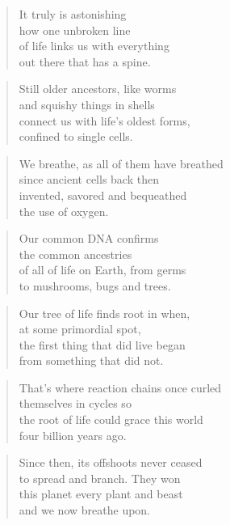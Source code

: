 \documentclass[14pt,a4paper]{article}
\begin{document}
\begin{verse}
It truly is astonishing\\
how one unbroken line\\
of life links us with everything\\
out there that has a spine.
\end{verse}

\begin{verse}
Still older ancestors, like worms\\
and squishy things in shells\\
connect us with life’s oldest forms,\\
confined to single cells.
\end{verse}

\begin{verse}
We breathe, as all of them have breathed\\
since ancient cells back then\\
invented, savored and bequeathed\\
the use of oxygen.
\end{verse}

\begin{verse}
Our common DNA confirms\\
the common ancestries\\
of all of life on Earth, from germs\\
to mushrooms, bugs and trees.
\end{verse}

\begin{verse}
Our tree of life finds root in when,\\
at some primordial spot,\\
the first thing that did live began\\
from something that did not.
\end{verse}

\begin{verse}
That’s where reaction chains once curled\\
themselves in cycles so\\
the root of life could grace this world\\
four billion years ago.
\end{verse}

\begin{verse}
Since then, its offshoots never ceased\\
to spread and branch. They won\\
this planet every plant and beast\\
and we now breathe upon.
\end{verse}
\end{document}
